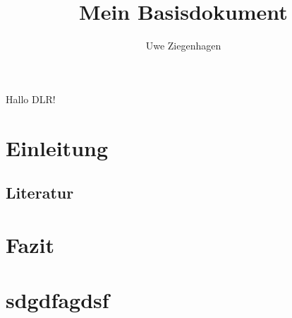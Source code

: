 \documentclass[12pt,ngerman,parskip=half]{scrreprt}
\author{Uwe Ziegenhagen}
\title{Mein Basisdokument}
\begin{document}
\maketitle

\tableofcontents

Hallo DLR!

\chapter{Einleitung}

\section{Literatur}

\blindtext[2]

\blindtext[2]

\chapter{Fazit}

\chapter{sdgdfagdsf}
\end{document}
